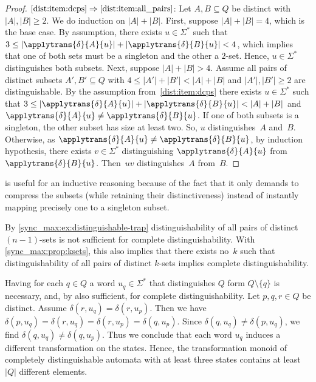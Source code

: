\begin{proof}
	$\ref{dist:item:dcps} \Rightarrow \ref{dist:item:all_pairs}$:
	Let $A,B \subseteq Q$
	be distinct with $|A|, |B| \ge 2$.
	We do induction on $|A| + |B|$.
	First, suppose $|A| + |B| = 4$, which is the base case.
	By assumption, there exists $u \in \Sigma^*$
	such that $3 \le |\applytrans{\delta}{A}{u}| + |\applytrans{\delta}{B}{u}|  < 4$, which
	implies that one of both sets must be a singleton and the other a $2$-set.
	Hence, $u \in \Sigma^*$ distinguishes both subsets.
	Next, suppose $|A| + |B| > 4$. Assume all pairs of distinct subsets $A', B' \subseteq Q$
	with $4 \le |A'| + |B'| < |A| + |B|$
	and $|A'|, |B'| \ge 2$ are distinguishable.
	By the assumption from~\cref{dist:item:dcps} there exists
	$u \in \Sigma^*$
	such that  $3 \le |\applytrans{\delta}{A}{u}| + |\applytrans{\delta}{B}{u}|  < |A| + |B|$
	and $\applytrans{\delta}{A}{u} \ne \applytrans{\delta}{B}{u}$.
	If one of both subsets is a singleton, the other subset has size at least two.
	So, $u$ distinguishes~$A$ and~$B$.
	Otherwise, as $\applytrans{\delta}{A}{u} \ne \applytrans{\delta}{B}{u}$, by induction hypothesis, 
	there exists $v \in \Sigma^*$
	distinguishing $\applytrans{\delta}{A}{u}$ from $\applytrans{\delta}{B}{u}$.
	Then~$uv$ distinguishes~$A$ from~$B$.
\end{proof}

 is useful for an inductive reasoning
because of the fact that it only demands to compress the subsets (while retaining their distinctiveness)
instead of instantly mapping precisely one to a singleton subset.

\begin{remark}
 By \cref{sync_max:ex:distinguishable-trap} 	
 distinguishability of all pairs of distinct $(n-1)$-sets 
 is not sufficient for complete distinguishability.
 With \cref{sync_max:prop:ksets},
 this also implies that there exists no~$k$
 such that distinguishability of all pairs of distinct $k$-sets
 implies complete distinguishability.
\end{remark}

\begin{remark}
  Having for each $q \in Q$ a word $u_q \in \Sigma^*$
  that distinguishes $Q$ form $Q \setminus \{q\}$
  is necessary, and, by 
  also sufficient, for complete distinguishability.
  Let $p,q,r \in Q$ be distinct.
  Assume $\delta(r, u_q) = \delta(r, u_p)$.
  Then we have $\delta(p, u_q) = \delta(r, u_q) = \delta(r, u_p) = \delta(q, u_p)$.
  Since $\delta(q, u_q) \ne \delta(p, u_q)$,
  we find  $\delta(q, u_q) \ne \delta(q, u_p)$.
  Thus we conclude that each word $u_q$ induces a different
  transformation on the states.
  Hence, the transformation monoid of completely distinguishable
  automata with at least three states contains at least~$|Q|$ different elements.
\end{remark}

